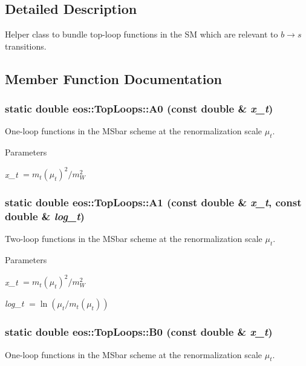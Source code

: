 \subsection{Detailed Description}
Helper class to bundle top-\/loop functions in the SM which are relevant to $b\to s$ transitions. 

\subsection{Member Function Documentation}
\hypertarget{structeos_1_1TopLoops_a1e5d26b35652a99a5e3e125d5814b1cf}{
\subsubsection[{A0}]{\setlength{\rightskip}{0pt plus 5cm}static double eos::TopLoops::A0 (const double \& {\em x\_\-t})}}
\label{structeos_1_1TopLoops_a1e5d26b35652a99a5e3e125d5814b1cf}
One-\/loop functions in the MSbar scheme at the renormalization scale $\mu_t$.


\begin{DoxyParams}{Parameters}
\item[{\em x\_\-t}]$= m_t(\mu_t)^2 / m_W^2$ \end{DoxyParams}
\hypertarget{structeos_1_1TopLoops_a08fdb46fd02c3605cdd401d8b2f7efac}{
\subsubsection[{A1}]{\setlength{\rightskip}{0pt plus 5cm}static double eos::TopLoops::A1 (const double \& {\em x\_\-t}, \/  const double \& {\em log\_\-t})}}
\label{structeos_1_1TopLoops_a08fdb46fd02c3605cdd401d8b2f7efac}
Two-\/loop functions in the MSbar scheme at the renormalization scale $\mu_t$.


\begin{DoxyParams}{Parameters}
\item[{\em x\_\-t}]$= m_t(\mu_t)^2 / m_W^2$ \item[{\em log\_\-t}]$= \ln(\mu_t / m_t(\mu_t))$ \end{DoxyParams}
\hypertarget{structeos_1_1TopLoops_a99b769758ffe71507b5424fd98657f43}{
\subsubsection[{B0}]{\setlength{\rightskip}{0pt plus 5cm}static double eos::TopLoops::B0 (const double \& {\em x\_\-t})}}
\label{structeos_1_1TopLoops_a99b769758ffe71507b5424fd98657f43}
One-\/loop functions in the MSbar scheme at the renormalization scale $\mu_t$.


